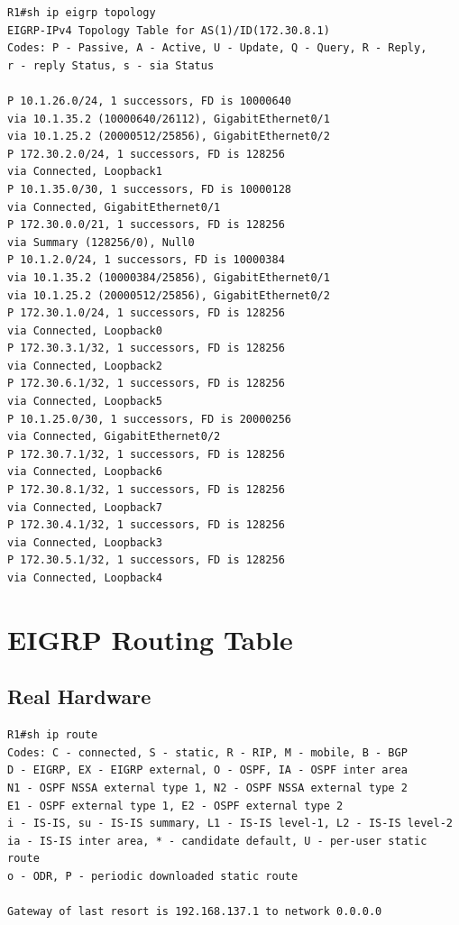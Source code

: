 \documentclass[11pt]{report}
\begin{document}
\begin{appendices}
\begin{lstlisting}
R1#sh ip eigrp topology
EIGRP-IPv4 Topology Table for AS(1)/ID(172.30.8.1)
Codes: P - Passive, A - Active, U - Update, Q - Query, R - Reply,
r - reply Status, s - sia Status

P 10.1.26.0/24, 1 successors, FD is 10000640
via 10.1.35.2 (10000640/26112), GigabitEthernet0/1
via 10.1.25.2 (20000512/25856), GigabitEthernet0/2
P 172.30.2.0/24, 1 successors, FD is 128256
via Connected, Loopback1
P 10.1.35.0/30, 1 successors, FD is 10000128
via Connected, GigabitEthernet0/1
P 172.30.0.0/21, 1 successors, FD is 128256
via Summary (128256/0), Null0
P 10.1.2.0/24, 1 successors, FD is 10000384
via 10.1.35.2 (10000384/25856), GigabitEthernet0/1
via 10.1.25.2 (20000512/25856), GigabitEthernet0/2
P 172.30.1.0/24, 1 successors, FD is 128256
via Connected, Loopback0
P 172.30.3.1/32, 1 successors, FD is 128256
via Connected, Loopback2
P 172.30.6.1/32, 1 successors, FD is 128256
via Connected, Loopback5
P 10.1.25.0/30, 1 successors, FD is 20000256
via Connected, GigabitEthernet0/2
P 172.30.7.1/32, 1 successors, FD is 128256
via Connected, Loopback6
P 172.30.8.1/32, 1 successors, FD is 128256
via Connected, Loopback7
P 172.30.4.1/32, 1 successors, FD is 128256
via Connected, Loopback3
P 172.30.5.1/32, 1 successors, FD is 128256
via Connected, Loopback4
\end{lstlisting}

\section{EIGRP Routing Table}

\subsection{Real Hardware}
\begin{lstlisting}
R1#sh ip route
Codes: C - connected, S - static, R - RIP, M - mobile, B - BGP
D - EIGRP, EX - EIGRP external, O - OSPF, IA - OSPF inter area
N1 - OSPF NSSA external type 1, N2 - OSPF NSSA external type 2
E1 - OSPF external type 1, E2 - OSPF external type 2
i - IS-IS, su - IS-IS summary, L1 - IS-IS level-1, L2 - IS-IS level-2
ia - IS-IS inter area, * - candidate default, U - per-user static route
o - ODR, P - periodic downloaded static route

Gateway of last resort is 192.168.137.1 to network 0.0.0.0


\end{lstlisting}
\end{appendices}
\end{document}
